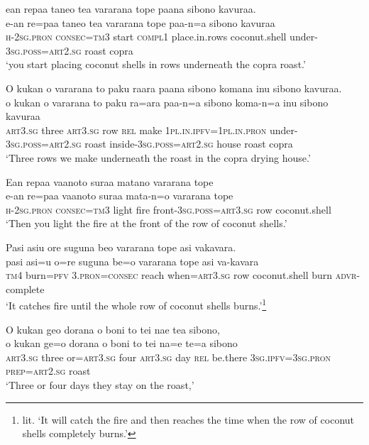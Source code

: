\ea\label{ex:text01-161}
ean repaa taneo tea vararana tope paana sibono kavuraa.\\
\gll e-an	re=paa	taneo	tea	vararana	tope	paa-n=a	sibono	kavuraa\\
     \textsc{h}-2\textsc{sg}.\textsc{pron}	\textsc{consec}=\textsc{tm}3	start	\textsc{compl}1	place.in.rows	coconut.shell	under-3\textsc{sg}.\textsc{poss}=\textsc{art}2.\textsc{sg}	roast	copra\\
\glt `you start placing coconut shells in rows underneath the copra roast.'
\z

\ea\label{ex:text01-162}
O kukan o vararana to paku raara paana sibono komana inu sibono kavuraa.\\
\gll o	kukan	o	vararana	to	paku	ra=ara	paa-n=a	sibono	koma-n=a	inu	sibono	kavuraa\\
     \textsc{art}3.\textsc{sg}	three	\textsc{art}3.\textsc{sg}	row	\textsc{rel}	make	1\textsc{pl}.\textsc{in}.\textsc{ipfv}=1\textsc{pl}.\textsc{in}.\textsc{pron}	under-3\textsc{sg}.\textsc{poss}=\textsc{art}2.\textsc{sg}	roast	inside-3\textsc{sg}.\textsc{poss}=\textsc{art}2.\textsc{sg}	house	roast	copra\\
\glt `Three rows we make underneath the roast in the copra drying house.'
\z

\ea\label{ex:text01-163}
Ean repaa vaanoto suraa matano vararana tope\\
\gll e-an	re=paa	vaanoto	suraa	mata-n=o	vararana	tope\\
     \textsc{h}-2\textsc{sg}.\textsc{pron}	\textsc{consec}=\textsc{tm}3	light	fire	front-3\textsc{sg}.\textsc{poss}=\textsc{art}3.\textsc{sg}	row	coconut.shell\\
\glt `Then you light the fire at the front of the row of coconut shells.'
\z

\ea\label{ex:text01-164}
Pasi asiu ore suguna beo vararana tope asi vakavara.\\
\gll pasi	asi=u	o=re	suguna	be=o	vararana	tope	asi	va-kavara\\
     \textsc{tm}4	burn=\textsc{pfv}	3.\textsc{pron}=\textsc{consec}	reach	when=\textsc{art}3.\textsc{sg}	row	coconut.shell	burn	\textsc{advr}-complete\\
\glt `It catches fire until the whole row of coconut shells burns.'\footnote{lit. `It will catch the fire and then reaches the time when the row of coconut shells completely burns.'}
\z

\ea\label{ex:text01-165}
O kukan geo dorana o boni to tei nae tea sibono,\\
\gll o	kukan	ge=o	dorana	o	boni	to	tei	na=e	te=a	sibono\\
     \textsc{art}3.\textsc{sg}	three	or=\textsc{art}3.\textsc{sg}	four	\textsc{art}3.\textsc{sg}	day	\textsc{rel}	be.there	3\textsc{sg}.\textsc{ipfv}=3\textsc{sg}.\textsc{pron}	\textsc{prep}=\textsc{art}2.\textsc{sg}	roast\\
\glt `Three or four days they stay on the roast,'
\z

